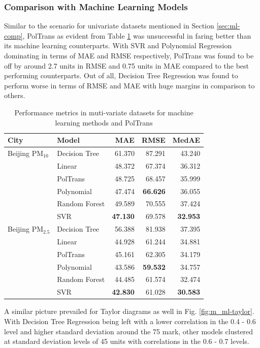 \documentclass[10pt,journal]{IEEEtran}
\begin{document}
\subsubsection{Comparison with Machine Learning Models}

Similar to the scenario for univariate datasets mentioned in Section \ref{sec:ml-comp}, {PolTrans} as evident from Table \ref{tbl:m_ml-performance} was unsuccessful in faring better than its machine learning counterparts. With SVR and Polynomial Regression dominating in terms of MAE and RMSE respectively, {PolTrans} was found to be off by around 2.7 units in RMSE and 0.75 units in MAE compared to the best performing counterparts. Out of all, Decision Tree Regression was found to perform worse in terms of RMSE and MAE with huge margins in comparison to others.

\begin{table}[h]
\small
\centering
\tabcolsep=0.16cm
\caption{Performance metrics in muti-variate datasets for machine learning methods and PolTrans}
\label{tbl:m_ml-performance}
\begin{tabular}{llrrr}
\toprule
City & Model & MAE & RMSE & MedAE \\
\midrule
Beijing PM${_{10}}$ & Decision Tree & 61.370 & 87.291 & 43.240 \\
& Linear & 48.372 & 67.374 & 36.312 \\
& PolTrans & 48.725 & 68.457 & 35.999 \\
& Polynomial & 47.474 & \textbf{66.626} & 36.055 \\
& Random Forest & 49.589 & 70.555 & 37.424 \\
& SVR & \textbf{47.130} & 69.578 & \textbf{32.953} \\
Beijing PM${_{2.5}}$ & Decision Tree & 56.388 & 81.938 & 37.395 \\
& Linear & 44.928 & 61.244 & 34.881 \\
& PolTrans & 45.161 & 62.305 & 34.179 \\
& Polynomial & 43.586 & \textbf{59.532} & 34.757 \\
& Random Forest & 44.485 & 61.574 & 32.474 \\
& SVR & \textbf{42.830} & 61.028 & \textbf{30.583} \\
\bottomrule
\end{tabular}
\end{table}

A similar picture prevailed for Taylor diagrams as well in Fig. \ref{fig:m_ml-taylor}. With Decision Tree Regression being left with a lower correlation in the 0.4 - 0.6 level and higher standard deviation around the 75 mark, other models clustered at standard deviation levels of 45 units with correlations in the 0.6 - 0.7 levels.
\end{document}
